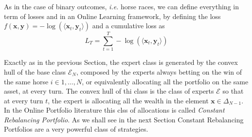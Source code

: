 As in the case of binary outcomes, \emph{i.e.} horse races, we can define everything in term of losses and in an Online Learning framework, by defining the loss $f(\mathbf x,\mathbf y)=-\log(\langle\mathbf x_t, \mathbf y_t\rangle)$ and a cumulative loss as 
$$L_T=\sum\limits_{t=1}^T-\log(\langle\mathbf x_t,\mathbf y_t\rangle)$$

Exactly as in the previous Section, the expert class is generated by the convex hull of the base class $\mathcal E_N$, composed by the experts always betting on the win of the same horse $i\in1,\ldots,N$, or equivalently allocating all the portfolio on the same asset, at every turn. The convex hull of thi class is the class of experts $\mathcal E$ so that at every turn $t$, the expert is allocating all the wealth in the element $\mathbf x\in\Delta_{N-1}$. In the Online Portfolio literature this clss of allocations is called \emph{Constant Rebalancing Portfolio}.  As we shall see in the next Section Constant Rebalancing Portfolios are a very powerful class of strategies.

